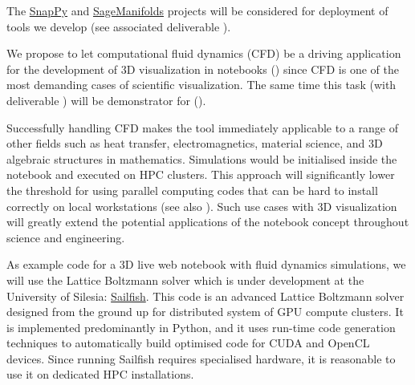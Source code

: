 \begin{workpackage}
\begin{tasklist}
\begin{task}[title=Visualization system for 3D data in web-notebook
,id=vis3d,lead=SR, partners={US,PS,USO}, PM=13, wphases=0-24]
The \href{http://www.math.uic.edu/t3m/SnapPy/}{SnapPy} and
\href{http://sagemanifolds.obspm.fr/}{SageManifolds} projects will be
considered for deployment of tools we develop (see associated
deliverable ).
\end{task}


\begin{task}[title=Visualization of 3D fluid dynamics data in web-notebook
,id=cfd-vis,lead=SR, partners={US,PS,USO},PM=5,wphases=12-36]

We propose to let computational fluid dynamics (CFD) be a driving
application for the development of 3D visualization in \Jupyter
notebooks () since CFD is one of the most demanding
cases of scientific visualization. The same time this task
(with deliverable ) will be
demonstrator for ().

Successfully handling CFD makes the tool immediately applicable to a
range of other fields such as heat transfer, electromagnetics,
material science, and 3D algebraic structures in
mathematics. Simulations would be initialised inside the notebook and
executed on HPC clusters. This approach will significantly lower the
threshold for using parallel computing codes that can be hard to
install correctly on local workstations (see also ). Such
use cases with 3D visualization will greatly extend the potential
applications of the \Jupyter notebook concept throughout science and
engineering.

As example code for a 3D live web notebook with fluid dynamics
simulations, we will use the Lattice Boltzmann solver which is under
development at the University of Silesia:
\href{http://sailfish.us.edu.pl/}{Sailfish}.  This code is an advanced
Lattice Boltzmann solver designed from the ground up for distributed
system of GPU compute clusters. It is implemented predominantly in
Python, and it uses run-time code generation techniques to
automatically build optimised code for CUDA and OpenCL devices. Since
running Sailfish requires specialised hardware, it is reasonable to
use it on dedicated HPC installations.
\end{task}

\begin{task}[lead=UB,title=Common option system for various displays
  in Sage,id=Sage-display,PM=12,wphases=0-24]


\end{task}
\end{tasklist}
\end{workpackage}
